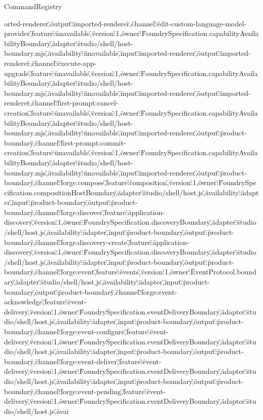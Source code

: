 \begin{lexlean}{CommandRegistry}
\begin{semanticmodule}
{orted-renderer\",\"output\":\"imported-renderer\"},{\"channel\":\"edit-custom-language-model-provider\",\"feature\":\"unavailable\",\"version\":1,\"owner\":\"FoundrySpecification.capabilityAvailabilityBoundary\",\"adapter\":\"studio/shell/host-boundary.mjs\",\"availability\":\"unavailable\",\"input\":\"imported-renderer\",\"output\":\"imported-renderer\"},{\"channel\":\"execute-app-upgrade\",\"feature\":\"unavailable\",\"version\":1,\"owner\":\"FoundrySpecification.capabilityAvailabilityBoundary\",\"adapter\":\"studio/shell/host-boundary.mjs\",\"availability\":\"unavailable\",\"input\":\"imported-renderer\",\"output\":\"imported-renderer\"},{\"channel\":\"first-prompt:cancel-creation\",\"feature\":\"unavailable\",\"version\":1,\"owner\":\"FoundrySpecification.capabilityAvailabilityBoundary\",\"adapter\":\"studio/shell/host-boundary.mjs\",\"availability\":\"unavailable\",\"input\":\"imported-renderer\",\"output\":\"product-boundary\"},{\"channel\":\"first-prompt:commit-creation\",\"feature\":\"unavailable\",\"version\":1,\"owner\":\"FoundrySpecification.capabilityAvailabilityBoundary\",\"adapter\":\"studio/shell/host-boundary.mjs\",\"availability\":\"unavailable\",\"input\":\"imported-renderer\",\"output\":\"product-boundary\"},{\"channel\":\"forge:compose\",\"feature\":\"composition\",\"version\":1,\"owner\":\"FoundrySpecification.compositionHostBoundary\",\"adapter\":\"studio/shell/host.js\",\"availability\":\"adapter\",\"input\":\"product-boundary\",\"output\":\"product-boundary\"},{\"channel\":\"forge:discover\",\"feature\":\"application-discovery\",\"version\":1,\"owner\":\"FoundrySpecification.discoveryBoundary\",\"adapter\":\"studio/shell/host.js\",\"availability\":\"adapter\",\"input\":\"product-boundary\",\"output\":\"product-boundary\"},{\"channel\":\"forge:discovery-create\",\"feature\":\"application-discovery\",\"version\":1,\"owner\":\"FoundrySpecification.discoveryBoundary\",\"adapter\":\"studio/shell/host.js\",\"availability\":\"adapter\",\"input\":\"product-boundary\",\"output\":\"product-boundary\"},{\"channel\":\"forge:event\",\"feature\":\"events\",\"version\":1,\"owner\":\"EventProtocol.boundary\",\"adapter\":\"studio/shell/host.js\",\"availability\":\"adapter\",\"input\":\"product-boundary\",\"output\":\"product-boundary\"},{\"channel\":\"forge:event-acknowledge\",\"feature\":\"event-delivery\",\"version\":1,\"owner\":\"FoundrySpecification.eventDeliveryBoundary\",\"adapter\":\"studio/shell/host.js\",\"availability\":\"adapter\",\"input\":\"product-boundary\",\"output\":\"product-boundary\"},{\"channel\":\"forge:event-configure\",\"feature\":\"event-delivery\",\"version\":1,\"owner\":\"FoundrySpecification.eventDeliveryBoundary\",\"adapter\":\"studio/shell/host.js\",\"availability\":\"adapter\",\"input\":\"product-boundary\",\"output\":\"product-boundary\"},{\"channel\":\"forge:event-deliver\",\"feature\":\"event-delivery\",\"version\":1,\"owner\":\"FoundrySpecification.eventDeliveryBoundary\",\"adapter\":\"studio/shell/host.js\",\"availability\":\"adapter\",\"input\":\"product-boundary\",\"output\":\"product-boundary\"},{\"channel\":\"forge:event-pending\",\"feature\":\"event-delivery\",\"version\":1,\"owner\":\"FoundrySpecification.eventDeliveryBoundary\",\"adapter\":\"studio/shell/host.js\",\"avai}
\end{semanticmodule}
\end{lexlean}
